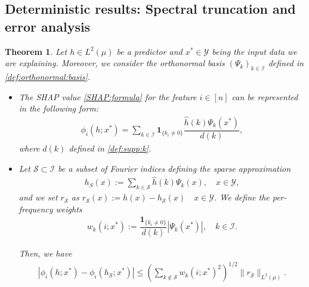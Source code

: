 \documentclass[letterpaper,11pt]{article}
\numberwithin{equation}{section}
\newtheorem{theorem}{Theorem}[section]
\renewcommand{\leq}{\leqslant}
\numberwithin{equation}{section}
\begin{document}
\subsection{Deterministic results: Spectral truncation and error analysis}

\begin{theorem}
    \label{proposition:SHAP:Fourier}
    Let $h\in L^2(\mu)$ be a predictor and $x^*\in \mathcal{Y}$ being the input data we are explaining. Moreover, we consider the orthonormal basis $(\Psi_k)_{k\in \mathcal{I}}$ defined in \eqref{def:orthonormal:basis}.
    \begin{itemize} 
    \item[(a)] The SHAP value \eqref{SHAP:formula} for the feature $i\in [n]$ can be represented in the following form:
    \begin{align}
        \label{Fourier:SHAP:formula}
        \phi_i(h;x^*)=\sum_{k\in \mathcal{I}} \bm{1}_{\{k_i \neq 0\}} \dfrac{\hat{h}(k)\Psi_k(x^*)}{d(k)},
    \end{align}
    where $d(k)$ defined in \eqref{def:supp:k}.
    \item[(b)] Let $\mathcal{S}\subset \mathcal{I}$ be a subset of Fourier indices defining the sparse approximation
    \begin{align*}
        h_S(x):=\sum_{k\in \mathcal{S}} \hat{h}(k)\Psi_k(x),\quad x\in \mathcal{Y},
    \end{align*}
    and we set $r_{\mathcal{S}}$ as $r_{\mathcal{S}}(x):= h(x)-h_{\mathcal{S}}(x)\quad x\in \mathcal{Y}$. We define the per-frequency weights 
    \begin{align*}
        w_k(i;x^*):=\dfrac{\bm{1}_{\{k_i\neq 0\}}}{d(k)} |\Psi_k(x^*)|,\quad k\in \mathcal{I}.
    \end{align*}
    
    Then, we have 
        \begin{align}
            \label{Thm:SHAP:01:result}
            |\phi_i(h;x^*) - \phi_i(h_{\mathcal{S}};x^*)|\leq \left( \sum_{k\notin \mathcal{S}} w_k(i;x^*)^2 \right)^{1/2} \|r_{\mathcal{S}}\|_{L^2(\mu)}.
        \end{align}   
    \end{itemize}
\end{theorem}
\end{document}
